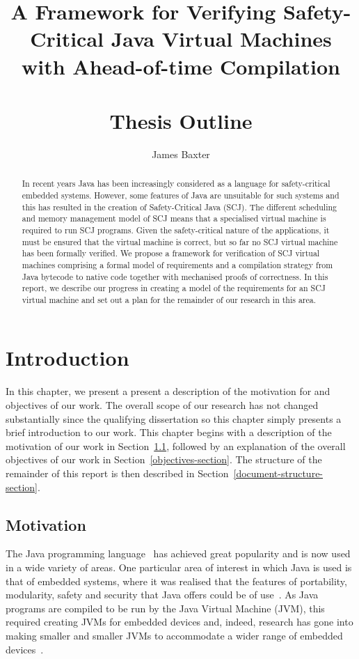 \documentclass[a4paper,10pt]{report}
\title{A Framework for Verifying Safety-Critical Java Virtual Machines
with Ahead-of-time Compilation \\ \hfill \\
\Large Thesis Outline}
\author{James Baxter}
\date{}
\begin{document}
\maketitle

\begin{abstract}
  In recent years Java has been increasingly considered as a language
  for safety-critical embedded systems.
  However, some features of Java are unsuitable for such systems and
  this has resulted in the creation of Safety-Critical Java (SCJ).
  The different scheduling and memory management model of SCJ means
  that a specialised virtual machine is required to run SCJ programs.
  Given the safety-critical nature of the applications, it must be
  ensured that the virtual machine is correct, but so far no SCJ
  virtual machine has been formally verified.
  We propose a framework for verification of SCJ virtual machines
  comprising a formal model of requirements and a compilation strategy
  from Java bytecode to native code together with mechanised proofs of
  correctness.
  In this report, we describe our progress in creating a model of the
  requirements for an SCJ virtual machine and set out a plan for the
  remainder of our research in this area.
\end{abstract}

\tableofcontents

\chapter{Introduction}

In this chapter, we present a present a description of the motivation
for and objectives of our work.
The overall scope of our research has not changed substantially since
the qualifying dissertation so this chapter simply presents a brief
introduction to our work.
This chapter begins with a description of the motivation of our work
in Section~\ref{motivation-section}, followed by an explanation of the
overall objectives of our work in Section~\ref{objectives-section}.
The structure of the remainder of this report is then described in
Section~\ref{document-structure-section}.


\section{Motivation}
\label{motivation-section}

The Java programming language~\cite{gosling2013} has achieved great
popularity and is now used in a wide variety of areas.
One particular area of interest in which Java is used is that of
embedded systems, where it was realised that the features of
portability, modularity, safety and security that Java offers could be
of use~\cite{mulchandani1998}.
As Java programs are compiled to be run by the Java Virtual Machine
(JVM), this required creating JVMs for embedded devices and, indeed,
research has gone into making smaller and smaller JVMs to accommodate
a wider range of embedded devices~\cite{caska2011,thomm2010}.
\end{document}
